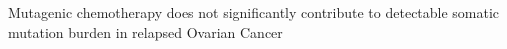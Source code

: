Mutagenic chemotherapy does not significantly contribute to detectable somatic mutation burden in relapsed Ovarian Cancer
